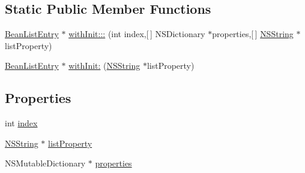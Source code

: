 \subsection*{\-Static \-Public \-Member \-Functions}
\begin{DoxyCompactItemize}
\item 
\hyperlink{interface_bean_list_entry}{\-Bean\-List\-Entry} $\ast$ \hyperlink{interface_bean_list_entry_a7c275f6e1768e590cf018cc4478019f8}{with\-Init\-:::} (int index,\mbox{[}$\,$\mbox{]} \-N\-S\-Dictionary $\ast$properties,\mbox{[}$\,$\mbox{]} \hyperlink{class_n_s_string}{\-N\-S\-String} $\ast$list\-Property)
\item 
\hyperlink{interface_bean_list_entry}{\-Bean\-List\-Entry} $\ast$ \hyperlink{interface_bean_list_entry_add8209b6ea6743b210927a4939393c3a}{with\-Init\-:} (\hyperlink{class_n_s_string}{\-N\-S\-String} $\ast$list\-Property)
\end{DoxyCompactItemize}
\subsection*{\-Properties}
\begin{DoxyCompactItemize}
\item 
int \hyperlink{interface_bean_list_entry_ae76e624597168e613d1ebd3cd5f80b70}{index}
\item 
\hyperlink{class_n_s_string}{\-N\-S\-String} $\ast$ \hyperlink{interface_bean_list_entry_a720e55cdf8ee2d92ba676ff6af374ce5}{list\-Property}
\item 
\-N\-S\-Mutable\-Dictionary $\ast$ \hyperlink{interface_bean_list_entry_ae7c542cab9a4e914550b063f70afd434}{properties}
\end{DoxyCompactItemize}


